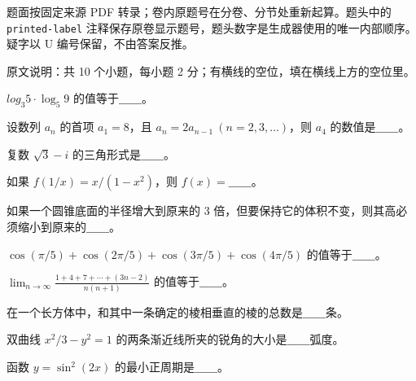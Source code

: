

\begin{gktip}
题面按固定来源 PDF 转录；卷内原题号在分卷、分节处重新起算。题头中的 \texttt{printed-label} 注释保存原卷显示题号，题头数字是生成器使用的唯一内部顺序。疑字以 U 编号保留，不由答案反推。
\end{gktip}


原文说明：共 10 个小题，每小题 2 分；有横线的空位，填在横线上方的空位里。

\begin{question}
$log_3 5\cdot\log_5 9$ 的值等于＿＿。

\end{question}
\begin{question}
设数列 ${a_n}$ 的首项 $a_1=8$，且 $a_n=2a_{n-1}\ (n=2,3,\ldots)$，则 $a_4$ 的数值是＿＿。

\end{question}
\begin{question}
复数 $\sqrt3-i$ 的三角形式是＿＿。

\end{question}
\begin{question}
如果 $f(1/x)=x/(1-x^2)$，则 $f(x)=$＿＿。

\end{question}
\begin{question}
如果一个圆锥底面的半径增大到原来的 3 倍，但要保持它的体积不变，则其高必须缩小到原来的＿＿。

\end{question}
\begin{question}
$\cos(\pi/5)+\cos(2\pi/5)+\cos(3\pi/5)+\cos(4\pi/5)$ 的值等于＿＿。

\end{question}
\begin{question}
$\displaystyle\lim_{n\to\infty}\frac{1+4+7+\cdots +(3n-2)}{n(n+1)}$ 的值等于＿＿。

\end{question}
\begin{question}
在一个长方体中，和其中一条确定的棱相垂直的棱的总数是＿＿条。

\end{question}
\begin{question}
双曲线 $x^2/3-y^2=1$ 的两条渐近线所夹的锐角的大小是＿＿弧度。

\end{question}
\begin{question}
函数 $y=\sin^2(2x)$ 的最小正周期是＿＿。

\end{question}

